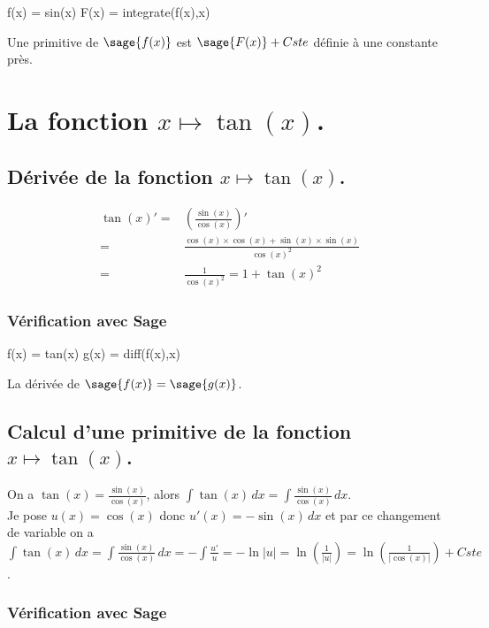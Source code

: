 \documentclass[a4paper,14pt]{extreport} %
\begin{document}
\begin{sageblock}
    f(x) = sin(x)
    F(x) = integrate(f(x),x)
\end{sageblock}

Une primitive de $\sage{f(x)}$ est $ \sage{F(x)} + Cste $ définie à une constante près.


\section{La fonction  $x \mapsto \tan(x)$.}

\subsection{Dérivée de la fonction $x \mapsto \tan(x)$.}


\begin{align*}
\tan(x)' = & \left(\frac{\sin(x)}{\cos(x)}\right)' \\ = & \frac{\cos(x) \times \cos(x)+\sin(x)\times \sin(x)}{\cos(x)^2}  \\ = & \frac{1}{\cos(x)^2} = 1 + \tan(x)^2
\end{align*}

\subsubsection{Vérification avec Sage}

\begin{sageblock}
    f(x) = tan(x)
    g(x) = diff(f(x),x)
\end{sageblock}

La dérivée de $\sage{f(x)} = \sage{g(x)} $.


\subsection{Calcul d'une primitive de la fonction  $x \mapsto \tan(x)$.}

On a $\tan(x)=\frac{\sin(x)}{\cos(x)}$, alors $\int \tan(x) \, dx =\int \frac{\sin(x)}{\cos(x)}\, dx$.\\
Je pose $u(x)=\cos(x)$ donc $u'(x)= -\sin(x) \,dx$ et par ce changement de variable on a $\int \tan(x) \, dx = \int \frac{\sin(x)}{\cos(x)}\, dx  = -\int \frac{u'}{u} = -\ln|u|  = \ln\left(\frac{1}{|u|}\right)  = \ln\left(\frac{1}{|\cos(x)|}\right) +Cste$.


\subsubsection*{Vérification avec Sage}
\end{document}
